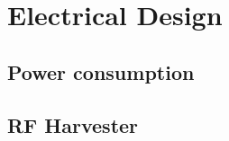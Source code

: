 

\setcounter{section}{4}
\section{Electrical Design}
\bigskip


\subsection{Power consumption}

\subsection{RF Harvester}


